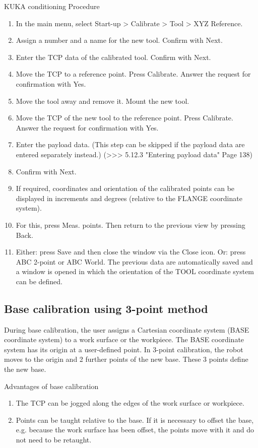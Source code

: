 \documentclass{book}
\begin{document}
\begin{chapter}{KUKA conditioning}
		Procedure
		\begin{enumerate}
			\item In the main menu, select Start-up > Calibrate > Tool > XYZ Reference.
			\item Assign a number and a name for the new tool. Confirm with Next.
			\item Enter the TCP data of the calibrated tool. Confirm with Next.
			\item Move the TCP to a reference point. Press Calibrate. Answer the request for confirmation with Yes. 
			\item Move the tool away and remove it. Mount the new tool.
			\item Move the TCP of the new tool to the reference point. Press Calibrate. Answer the request for confirmation with Yes.
			\item Enter the payload data. (This step can be skipped if the payload data are entered separately instead.)
				(>>> 5.12.3 "Entering payload data" Page 138)
			\item Confirm with Next.
			\item If required, coordinates and orientation of the calibrated points can be displayed in increments and degrees (relative to the FLANGE coordinate system).
			\item For this, press Meas. points. Then return to the previous view by pressing Back.
			\item Either: press Save and then close the window via the Close icon.
			Or: press ABC 2-point or ABC World. The previous data are automatically saved and a window is opened in which the orientation of the TOOL coordinate system can be defined.
		\end{enumerate}
		
		\subsection{Base calibration using 3-point method}
		
		During base calibration, the user assigns a Cartesian coordinate system (BASE coordinate system) to a work surface or the workpiece. The BASE coordinate system has its origin at a user-defined point. In 3-point calibration, the robot moves to the origin and 2 further points of the new base. These 3 points define the new base.
		
		Advantages of base calibration
		\begin{enumerate}
			\item The TCP can be jogged along the edges of the work surface or workpiece.
			\item Points can be taught relative to the base. If it is necessary to offset the base, e.g. because the work surface has been offset, the points move with it and do not need to be retaught.
		\end{enumerate}
		

\end{chapter}
\end{document}
